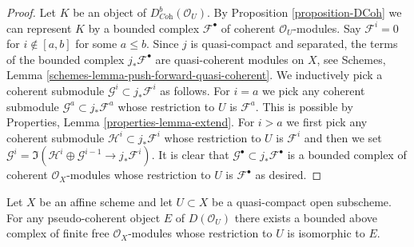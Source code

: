 \begin{proof}
Let $K$ be an object of $D^b_{\textit{Coh}}(\mathcal{O}_U)$.
By Proposition \ref{proposition-DCoh} we can represent $K$ by a bounded
complex $\mathcal{F}^\bullet$ of coherent $\mathcal{O}_U$-modules.
Say $\mathcal{F}^i = 0$ for $i \not \in [a, b]$ for some $a \leq b$.
Since $j$ is quasi-compact and separated, the terms of the bounded complex
$j_*\mathcal{F}^\bullet$ are quasi-coherent modules on $X$, see
Schemes, Lemma \ref{schemes-lemma-push-forward-quasi-coherent}.
We inductively pick a coherent submodule
$\mathcal{G}^i \subset j_*\mathcal{F}^i$ as follows.
For $i = a$ we pick any coherent submodule
$\mathcal{G}^a \subset j_*\mathcal{F}^a$ whose restriction
to $U$ is $\mathcal{F}^a$. This is possible by
Properties, Lemma \ref{properties-lemma-extend}.
For $i > a$ we first pick any coherent submodule
$\mathcal{H}^i \subset j_*\mathcal{F}^i$
whose restriction to $U$ is $\mathcal{F}^i$
and then we set
$\mathcal{G}^i = \Im(\mathcal{H}^i \oplus \mathcal{G}^{i - 1}
\to j_*\mathcal{F}^i)$. It is clear that
$\mathcal{G}^\bullet \subset j_*\mathcal{F}^\bullet$
is a bounded complex of coherent $\mathcal{O}_X$-modules
whose restriction to $U$ is $\mathcal{F}^\bullet$ as desired.
\end{proof}

\begin{lemma}
\label{lemma-lift-pseudo-coherent}
Let $X$ be an affine scheme and let $U \subset X$ be a quasi-compact
open subscheme. For any pseudo-coherent object $E$ of $D(\mathcal{O}_U)$
there exists a bounded above complex of finite free $\mathcal{O}_X$-modules 
whose restriction to $U$ is isomorphic to $E$.
\end{lemma}

